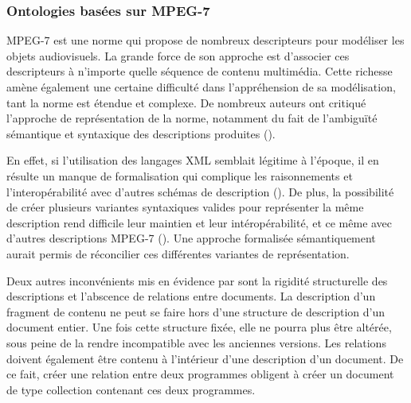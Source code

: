 






\subsubsection{Ontologies basées sur MPEG-7}\label{sec:mpeg7etc}
MPEG-7 est une norme qui propose de nombreux descripteurs pour modéliser les objets audiovisuels.
La grande force de son approche est d'associer ces descripteurs à n'importe quelle séquence de contenu multimédia.
Cette richesse amène également une certaine difficulté dans l'appréhension de sa modélisation, tant la norme est étendue et complexe. 
De nombreux auteurs ont critiqué l'approche de représentation de la norme, notamment du fait de l'ambiguïté sémantique et syntaxique des descriptions produites (\cite{VanOssenbruggen2004, Nack2005a, Troncy2007, Dasiopoulou2009, Arndt2007}).

En effet, si l'utilisation des langages XML semblait légitime à l'époque, il en résulte un manque de formalisation qui complique les raisonnements et l'interopérabilité avec d'autres schémas de description (\cite{Nack2005a}).
De plus, la possibilité de créer plusieurs variantes syntaxiques valides pour représenter la même description rend difficile leur maintien et leur intéropérabilité, et ce même avec d'autres descriptions MPEG-7 (\cite{Arndt2007}).
Une approche formalisée sémantiquement aurait permis de réconcilier ces différentes variantes de représentation. 

Deux autres inconvénients mis en évidence par \cite{Nack2005a} sont la rigidité structurelle des descriptions et l'abscence de relations entre documents. 
La description d'un fragment de contenu ne peut se faire hors d'une structure de description d'un document entier. 
Une fois cette structure fixée, elle ne pourra plus être altérée, sous peine de la rendre incompatible avec les anciennes versions.
Les relations doivent également être contenu à l'intérieur d'une description d'un document.
De ce fait, créer une relation entre deux programmes obligent à créer un document de type collection contenant ces deux programmes.

